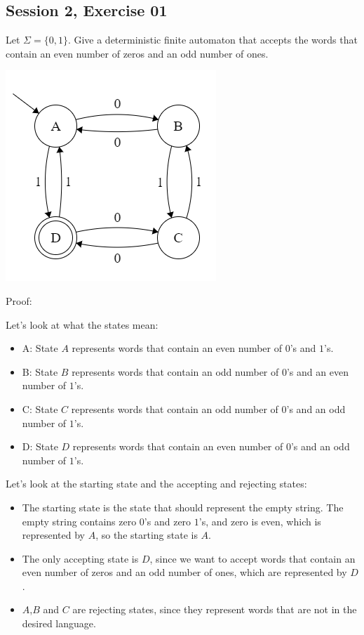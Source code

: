 \subsection{Session 2, Exercise 01}


Let $\Sigma=\{0,1\}$. Give a deterministic finite automaton that accepts the words that contain an even number of zeros and an odd number of ones.


\includegraphics[width=0.4\linewidth]{02/2_1.png}

Proof:

Let's look at what the states mean:

\begin{itemize}
    \item A: State $A$ represents words that contain an even number of $0$'s and $1$'s.
    \item B: State $B$ represents words that contain an odd number of $0$'s and an even number of $1$'s.
    \item C: State $C$ represents words that contain an odd number of $0$'s and an odd number of $1$'s.
    \item D: State $D$ represents words that contain an even number of $0$'s and an odd number of $1$'s.
\end{itemize}

Let's look at the starting state and the accepting and rejecting states:

\begin{itemize}
    \item The starting state is the state that should represent the empty string. The empty string contains zero $0$'s and zero $1$'s, and zero is even, which is represented by $A$, so the starting state is $A$.
    \item The only accepting state is $D$, since we want to accept words that contain an even number of zeros and an odd number of ones, which are represented by $D$.
    \item $A$,$B$ and $C$ are rejecting states, since they represent words that are not in the desired language.
\end{itemize}


